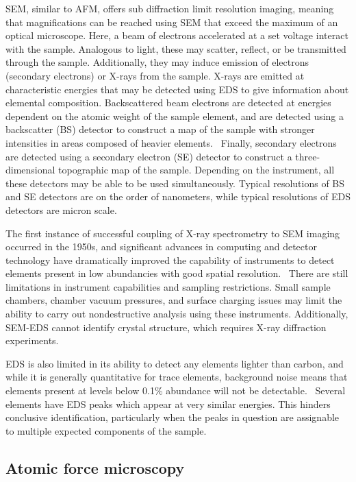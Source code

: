 SEM, similar to AFM, offers sub diffraction limit resolution imaging, meaning that magnifications can be reached using SEM that exceed the maximum of an optical microscope. Here, a beam of electrons accelerated at a set voltage interact with the sample. Analogous to light, these may scatter, reflect, or be transmitted through the sample. Additionally, they may induce emission of electrons (secondary electrons) or X-rays from the sample. X-rays are emitted at characteristic energies that may be detected using EDS to give information about elemental composition. Backscattered beam electrons are detected at energies dependent on the atomic weight of the sample element, and are detected using a backscatter (BS) detector to construct a map of the sample with stronger intensities in areas composed of heavier elements.~\autocite{Lazzara,Pradell,Schreiner} Finally, secondary electrons are detected using a secondary electron (SE) detector to construct a three-dimensional topographic map of the sample. Depending on the instrument, all these detectors may be able to be used simultaneously. Typical resolutions of BS and SE detectors are on the order of nanometers, while typical resolutions of EDS detectors are micron scale.~\autocite{Lazzara}

The first instance of successful coupling of X-ray spectrometry to SEM imaging occurred in the 1950s, and significant advances in computing and detector technology have dramatically improved the capability of instruments to detect elements present in low abundancies with good spatial resolution.~\autocite{Schreiner} There are still limitations in instrument capabilities and sampling restrictions. Small sample chambers, chamber vacuum pressures, and surface charging issues may limit the ability to carry out nondestructive analysis using these instruments. Additionally, SEM-EDS cannot identify crystal structure, which requires X-ray diffraction experiments.~\autocite{Lazzara,Schreiner} 

EDS is also limited in its ability to detect any elements lighter than carbon, and while it is generally quantitative for trace elements, background noise means that elements present at levels below 0.1\% abundance will not be detectable.~\autocite{Schreiner,Pradell,Lazzara} Several elements have EDS peaks which appear at very similar energies. This hinders conclusive identification, particularly when the peaks in question are assignable to multiple expected components of the sample. 


\subsection[Atomic force microscopy]{Atomic force microscopy}
\label{subsection1.2.3}

